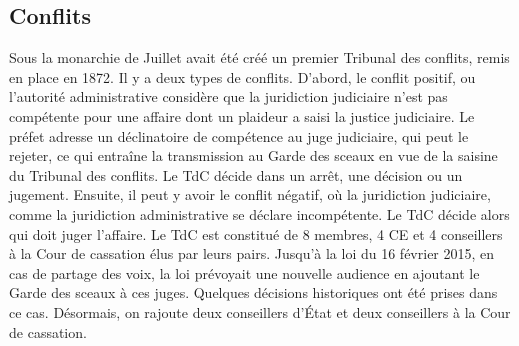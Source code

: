 \documentclass[math]{cours}
\begin{document}
\subsection{Conflits}
Sous la monarchie de Juillet avait été créé un premier Tribunal des conflits, remis en place en 1872.
Il y a deux types de conflits.
D'abord, le conflit positif, ou l'autorité administrative considère que la juridiction judiciaire n'est pas compétente pour une affaire dont un plaideur a saisi la justice judiciaire.
Le préfet adresse un déclinatoire de compétence au juge judiciaire, qui peut le rejeter, ce qui entraîne la transmission au Garde des sceaux en vue de la saisine du Tribunal des conflits.
Le TdC décide dans un arrêt, une décision ou un jugement.
Ensuite, il peut y avoir le conflit négatif, où la juridiction judiciaire, comme la juridiction administrative se déclare incompétente.
Le TdC décide alors qui doit juger l'affaire.
Le TdC est constitué de 8 membres, 4 CE et 4 conseillers à la Cour de cassation élus par leurs pairs.
Jusqu'à la loi du 16 février 2015, en cas de partage des voix, la loi prévoyait une nouvelle audience en ajoutant le Garde des sceaux à ces juges.
Quelques décisions historiques ont été prises dans ce cas.
Désormais, on rajoute deux conseillers d'État et deux conseillers à la Cour de cassation.
\end{document}
